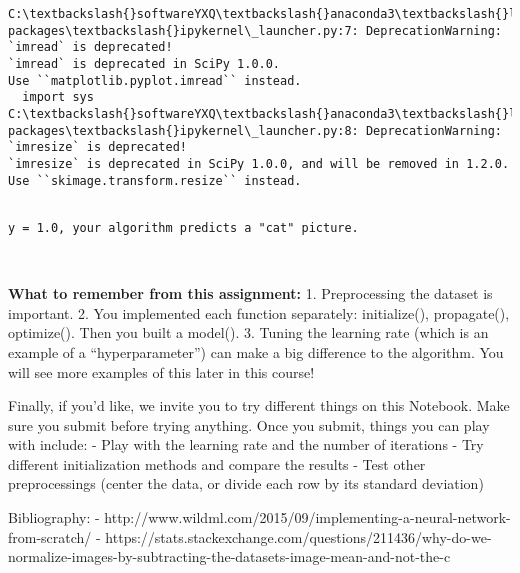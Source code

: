 \documentclass[11pt]{article}
\begin{document}
    \begin{Verbatim}[commandchars=\\\{\}]
C:\textbackslash{}softwareYXQ\textbackslash{}anaconda3\textbackslash{}lib\textbackslash{}site-packages\textbackslash{}ipykernel\_launcher.py:7: DeprecationWarning: `imread` is deprecated!
`imread` is deprecated in SciPy 1.0.0.
Use ``matplotlib.pyplot.imread`` instead.
  import sys
C:\textbackslash{}softwareYXQ\textbackslash{}anaconda3\textbackslash{}lib\textbackslash{}site-packages\textbackslash{}ipykernel\_launcher.py:8: DeprecationWarning: `imresize` is deprecated!
`imresize` is deprecated in SciPy 1.0.0, and will be removed in 1.2.0.
Use ``skimage.transform.resize`` instead.
  

    \end{Verbatim}

    \begin{Verbatim}[commandchars=\\\{\}]
y = 1.0, your algorithm predicts a "cat" picture.

    \end{Verbatim}

    \begin{center}
    \end{center}
    { \hspace*{\fill} \\}
    
    \textbf{What to remember from this assignment:} 1. Preprocessing the
dataset is important. 2. You implemented each function separately:
initialize(), propagate(), optimize(). Then you built a model(). 3.
Tuning the learning rate (which is an example of a ``hyperparameter'')
can make a big difference to the algorithm. You will see more examples
of this later in this course!

    Finally, if you'd like, we invite you to try different things on this
Notebook. Make sure you submit before trying anything. Once you submit,
things you can play with include: - Play with the learning rate and the
number of iterations - Try different initialization methods and compare
the results - Test other preprocessings (center the data, or divide each
row by its standard deviation)

    Bibliography: -
http://www.wildml.com/2015/09/implementing-a-neural-network-from-scratch/
-
https://stats.stackexchange.com/questions/211436/why-do-we-normalize-images-by-subtracting-the-datasets-image-mean-and-not-the-c


    
    
    
    
\end{document}
